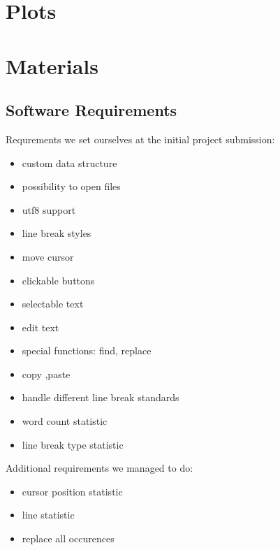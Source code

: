 \section{Plots}\label{sec:appendixA}



\section{Materials}\label{sec:appendixB}
\subsection{Software Requirements}\label{SwReq}
Requrements we set ourselves at the initial project submission:
\begin{itemize}
    \item custom data structure
    \item possibility to open files
    \item utf8 support
    \item line break styles
    \item move cursor
    \item clickable buttons
    \item selectable text
    \item edit text
    \item special functions: find, replace
    \item copy ,paste
    \item handle different line break standards
    \item word count statistic
    \item line break type statistic
\end{itemize}
Additional requirements we managed to do:
\begin{itemize}
    \item cursor position statistic
    \item line statistic 
    \item replace all occurences
\end{itemize}